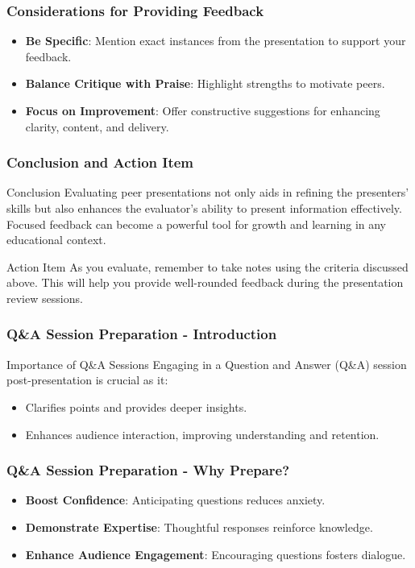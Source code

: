 \documentclass[aspectratio=169]{beamer}
\begin{document}
\begin{frame}[fragile]
    \frametitle{Considerations for Providing Feedback}
    \begin{itemize}
        \item \textbf{Be Specific}: Mention exact instances from the presentation to support your feedback.
        \item \textbf{Balance Critique with Praise}: Highlight strengths to motivate peers.
        \item \textbf{Focus on Improvement}: Offer constructive suggestions for enhancing clarity, content, and delivery.
    \end{itemize}
\end{frame}

\begin{frame}[fragile]
    \frametitle{Conclusion and Action Item}
    \begin{block}{Conclusion}
        Evaluating peer presentations not only aids in refining the presenters’ skills but also enhances the evaluator’s ability to present information effectively. Focused feedback can become a powerful tool for growth and learning in any educational context.
    \end{block}

    \begin{block}{Action Item}
        As you evaluate, remember to take notes using the criteria discussed above. This will help you provide well-rounded feedback during the presentation review sessions.
    \end{block}
\end{frame}

\begin{frame}[fragile]
    \frametitle{Q\&A Session Preparation - Introduction}
    \begin{block}{Importance of Q\&A Sessions}
        Engaging in a Question and Answer (Q\&A) session post-presentation is crucial as it:
        \begin{itemize}
            \item Clarifies points and provides deeper insights.
            \item Enhances audience interaction, improving understanding and retention.
        \end{itemize}
    \end{block}
\end{frame}

\begin{frame}[fragile]
    \frametitle{Q\&A Session Preparation - Why Prepare?}
    \begin{itemize}
        \item \textbf{Boost Confidence}: Anticipating questions reduces anxiety.
        \item \textbf{Demonstrate Expertise}: Thoughtful responses reinforce knowledge.
        \item \textbf{Enhance Audience Engagement}: Encouraging questions fosters dialogue.
    \end{itemize}
\end{frame}
\end{document}
